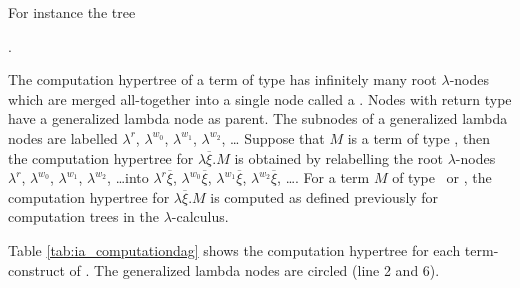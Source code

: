 For instance the tree
\begin{center}
.
\end{center}

The computation hypertree of a term of type \iavar has infinitely many root $\lambda$-nodes which are merged all-together into a single node called a . Nodes with return type \iavar have a generalized lambda node as parent.
The subnodes of a generalized lambda nodes are labelled
$\lambda^r$, $\lambda^{w_0}$, $\lambda^{w_1}$, $\lambda^{w_2}$, \ldots
Suppose that $M$ is a term of type \iavar, then the computation hypertree for $\lambda \overline{\xi} . M$ is obtained by relabelling the root $\lambda$-nodes $\lambda^r$,
$\lambda^{w_0}$, $\lambda^{w_1}$, $\lambda^{w_2}$, \ldots into
$\lambda^r \overline{\xi}$, $\lambda^{w_0} \overline{\xi}$,
$\lambda^{w_1} \overline{\xi}$, $\lambda^{w_2} \overline{\xi}$,
\ldots. For a term $M$  of type \iaexp\ or \iacom, the computation
hypertree for $\lambda \overline{\xi} . M$ is computed as defined previously for computation trees in the $\lambda$-calculus.

Table \ref{tab:ia_computationdag} shows the computation hypertree for each term-construct of \ialgol. The generalized lambda nodes are circled (line 2 and 6).


